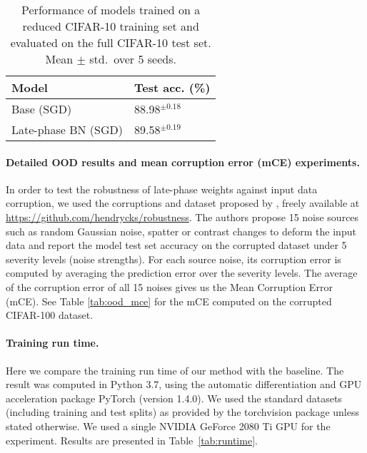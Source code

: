 \documentclass{article} \usepackage{iclr2021_conference,times}
\begin{document}
\begin{table}
\centering
\caption{Performance of models trained on a reduced CIFAR-10 training set and evaluated on the full CIFAR-10 test set.  Mean $\pm$ std.~over 5 seeds. \label{tab:reduced-c10}}
\vspace{-0.2cm}
\begin{tabular}{ll}
\toprule
Model & Test acc. (\%) \\\midrule
Base (SGD)      &    88.98$^{\pm 0.18}$  \\
Late-phase BN (SGD)   & 89.58$^{\pm 0.19}$ \\\bottomrule  
\end{tabular}
\end{table}

\paragraph{Detailed OOD results and mean corruption error (mCE) experiments.}
In order to test the robustness of late-phase weights against input data corruption, we used the  corruptions and dataset proposed by \citet{hendrycks_benchmarking_2019}, freely available at \url{https://github.com/hendrycks/robustness}. The authors propose 15 noise sources such as random Gaussian noise, spatter or contrast changes to deform the input data and report the model test set accuracy on the corrupted dataset under 5 severity levels (noise strengths). For each source noise, its corruption error is computed by averaging the prediction error over the severity levels. The average of the corruption error of all 15 noises gives us the Mean Corruption Error (mCE). See Table \ref{tab:ood_mce} for the mCE computed on the corrupted CIFAR-100 dataset.

\paragraph{Training run time.} Here we compare the training run time of our method with the baseline. The result was computed in Python 3.7, using the automatic differentiation and GPU acceleration package PyTorch (version 1.4.0). We used the standard datasets (including training and test splits) as provided by the torchvision package unless stated otherwise. We used a single NVIDIA GeForce 2080 Ti GPU for the experiment. Results are presented in Table~\ref{tab:runtime}.
\end{document}
